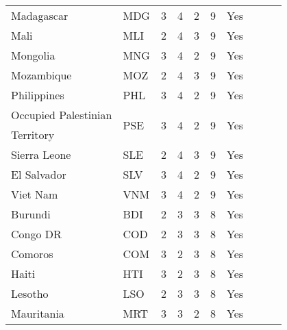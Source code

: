 \begin{longtable}{l l c c c c c c c c}
Madagascar                 & MDG           & 3          & 4                   & 2         & 9                 & Yes             \\
Mali                       & MLI           & 2          & 4                   & 3         & 9                 & Yes             \\
Mongolia                   & MNG           & 3          & 4                   & 2         & 9                 & Yes             \\
Mozambique                 & MOZ           & 2          & 4                   & 3         & 9                 & Yes             \\
Philippines                & PHL           & 3          & 4                   & 2         & 9                 & Yes             \\
Occupied Palestinian & \multirow{2}{*}{PSE}           & \multirow{2}{*}{3}          & \multirow{2}{*}{4}                   & \multirow{2}{*}{2}         & \multirow{2}{*}{9}                 & \multirow{2}{*}{Yes}             \\
Territory \\
Sierra Leone               & SLE           & 2          & 4                   & 3         & 9                 & Yes             \\
El Salvador                & SLV           & 3          & 4                   & 2         & 9                 & Yes             \\
Viet Nam                   & VNM           & 3          & 4                   & 2         & 9                 & Yes             \\
Burundi                    & BDI           & 2          & 3                   & 3         & 8                 & Yes             \\
Congo DR                   & COD           & 2          & 3                   & 3         & 8                 & Yes             \\
Comoros                    & COM           & 3          & 2                   & 3         & 8                 & Yes             \\
Haiti                      & HTI           & 3          & 2                   & 3         & 8                 & Yes             \\
Lesotho                    & LSO           & 2          & 3                   & 3         & 8                 & Yes             \\
Mauritania                 & MRT           & 3          & 3                   & 2         & 8                 & Yes             \\

\end{longtable}

